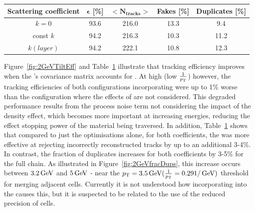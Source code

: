 \begin{table}[htbp]
\label{tab:trackFindingPerformance2GeVKF}
\centering
\begin{tabular}{ccccc}
   \hline
   \bf{Scattering coefficient} & \bf{$\bm{\epsilon}$ [\%]} & $\bm{<N_{tracks}>}$ & \bf{Fakes [\%]} & \bf{Duplicates [\%]}  \\
   \hline
   $k = 0$  & 93.6 & 216.0 & 13.3 & 9.4 \\      
   \hline
   const $k$ & 94.2 & 216.3 & 10.3 & 11.2 \\      
   \hline
    $k(layer)$ & 94.2 & 222.1 & 10.8 & 12.3 \\  
   \hline
   
\end{tabular}%
\end{table}

Figure~\ref{fig:2GeVTiltEff} and Table~\ref{tab:trackFindingPerformance2GeVKF} illustrate that tracking efficiency improves when the \KF's covariance matrix accounts for \MS.
At high \pT (low $\frac{1}{p_{\mathrm{T}}}$) however, the tracking efficiencies of both \KF configurations incorporating \MS were up to 1\% worse than the configuration where the effects of \MS are not considered.
This degraded performance results from the process noise term not considering the impact of the density effect, which becomes more important at increasing energies, reducing the effect stopping power of the material being traversed.
In addition, Table~\ref{tab:trackFindingPerformance2GeVKF} shows that compared to just the \HT optimisations alone, for both \MS coefficients, the \KF was more effective at rejecting incorrectly reconstructed tracks by up to an additional 3-4\%.
In contrast, the fraction of duplicates increases for both coefficients by 3-5\% for the full chain.
As illustrated in Figure~\ref{fig:2GeVfracDups}, this increase occurs between $3.2\,\text{Ge\hspace{-.08em}V}$ and $5\,\text{Ge\hspace{-.08em}V}$ - near the $p_{\mathrm{T}} = 3.5\,\text{Ge\hspace{-.08em}V} (\frac{1}{p_{\mathrm{T}}} = 0.29 1/\,\text{Ge\hspace{-.08em}V})$ threshold for merging adjacent \HT cells.
Currently it is not understood how incorporating \MS into the \KF causes this, but it is suspected to be related to the use of the reduced precision of \HT cells.

